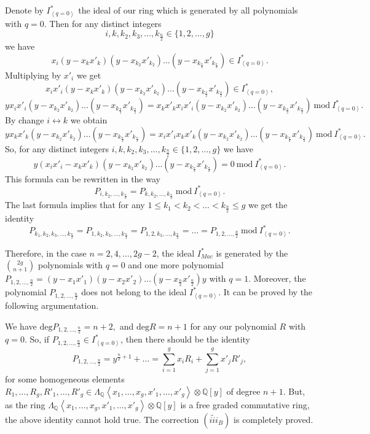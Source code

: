 \documentclass[a4paper,14pt]{article}
\newcommand{\Q}{\mathbb{Q}}
\begin{document}
Denote by $I^*_{\left< q=0 \right>}$ the ideal of our ring which is generated by all polynomials with $q=0$. Then for any distinct integers 
$$
i,k,k_2,k_3,\ldots,k_{\frac{n}{2}}\in \{1,2,\ldots,g \}
$$
we have
$$
x_i(y-x_kx'_k)(y-x_{k_2}x'_{k_2})\ldots (y-x_{k_{\frac{n}{2}}}x'_{k_{\frac{n}{2}}}) \in  I^*_{\left< q=0 \right>}.
$$
Multiplying by $x'_i$ we get
$$
x_ix'_i(y-x_kx'_k)(y-x_{k_2}x'_{k_2})\ldots (y-x_{k_{\frac{n}{2}}}x'_{k_{\frac{n}{2}}}) \in  I^*_{\left< q=0 \right>},
$$
$$
y x_ix'_i(y-x_{k_2}x'_{k_2})\ldots (y-x_{k_{\frac{n}{2}}}x'_{k_{\frac{n}{2}}}) = x_kx'_k x_ix'_i (y-x_{k_2}x'_{k_2})\ldots (y-x_{k_{\frac{n}{2}}}x'_{k_{\frac{n}{2}}}) \ \mbox{mod} \  I^*_{\left< q=0 \right>}.
$$ 
By change $i\leftrightarrow k$ we obtain
$$
y x_kx'_k(y-x_{k_2}x'_{k_2})\ldots (y-x_{k_{\frac{n}{2}}}x'_{k_{\frac{n}{2}}}) = x_ix'_i x_kx'_k (y-x_{k_2}x'_{k_2})\ldots (y-x_{k_{\frac{n}{2}}}x'_{k_{\frac{n}{2}}}) \ \mbox{mod} \  I^*_{\left< q=0 \right>}.
$$ 
So, for any distinct integers $i,k,k_2,k_3,\ldots,k_{\frac{n}{2}}\in \{1,2,\ldots,g \}$ we have
$$
y (x_ix'_i - x_kx'_k)(y-x_{k_2}x'_{k_2})\ldots (y-x_{k_{\frac{n}{2}}}x'_{k_{\frac{n}{2}}}) = 0  \ \mbox{mod} \  I^*_{\left< q=0 \right>}.
$$
This formula can be rewritten in the way
$$
P_{i,k_2,\ldots,k_{\frac{n}{2}}} =  P_{k,k_2,\ldots,k_{\frac{n}{2}}} \ \mbox{mod} \  I^*_{\left< q=0 \right>}.
$$
The last formula implies that for any $1\le k_1< k_2<\ldots<k_{\frac{n}{2}}\le g$ we get the identity
$$
P_{k_1,k_2,k_3,\ldots,k_{\frac{n}{2}}} = P_{1,k_2,k_3,\ldots,k_{\frac{n}{2}}} = P_{1,2,k_3,\ldots,k_{\frac{n}{2}}} = \ldots = P_{1,2,\ldots,\frac{n}{2}}  \ \mbox{mod} \  I^*_{\left< q=0 \right>}.
$$

Therefore, in the case $n=2,4,\ldots,2g-2$, the ideal $I^*_{Mac}$ is generated by the $\binom{2g}{n+1}$ polynomials with $q=0$ and one more polynomial $P_{1,2,\ldots,\frac{n}{2}} = (y-x_1x'_1)(y-x_2x'_2)\ldots(y-x_{\frac{n}{2}}x'_{\frac{n}{2}})y$ with $q=1$. Moreover, the polynomial $P_{1,2,\ldots,\frac{n}{2}}$ does not belong to the ideal $I^*_{\left< q=0 \right>}$. It can be proved by the following argumentation.

We have $\mathrm{deg}P_{1,2,\ldots,\frac{n}{2}} = n+2,$ and $\mathrm{deg}R = n+1$ for any our polynomial $R$ with $q=0$. So, if $P_{1,2,\ldots,\frac{n}{2}} \in I^*_{\left< q=0 \right>}$, then there should be the identity
$$
P_{1,2,\ldots,\frac{n}{2}} = y^{\frac{n}{2} + 1} + \ldots = \sum_{i=1}^g x_i R_i + \sum_{j=1}^g x'_jR'_j,
$$
for some homogeneous elements $R_1,\ldots,R_g,R'_1,\ldots,R'_g \in \Lambda_{\Q} \left< x_1,\ldots,x_g,x'_1,\ldots,x'_g \right>\otimes \Q[y]$ of degree $n+1$. But, as the ring $\Lambda_{\Q} \left< x_1,\ldots,x_g,x'_1,\ldots,x'_g \right>\otimes \Q[y]$ is a free graded commutative ring, the above identity cannot hold true. The correction $(\widetilde{iii}_B)$ is completely proved.
\end{document}
